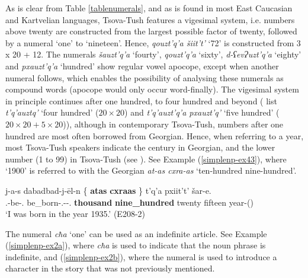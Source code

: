 As is clear from Table \ref{tablenumerals}, and as is found in most East Caucasian and Kartvelian languages, Tsova-Tush features a vigesimal system, i.e. numbers above twenty are constructed from the largest possible factor of twenty, followed by a numeral `one' to `nineteen'. Hence, \textit{qouzt'q'a šiit't'} `72' is constructed from 3 x 20 + 12. The numerals \textit{šauzt'q'a} `fourty', \textit{qouzt'q'a} `sixty', \textit{d-ʕevɁuzt'q'a} `eighty' and \textit{pxauzt'q'a} `hundred' show regular vowel apocope, except when another numeral follows, which enables the possibility of analysing these numerals as compound words (apocope would only occur word-finally). The vigesimal system in principle continues after one hundred, to four hundred and beyond (\citealt{kadkad84} list \textit{t'q'auztq'} `four hundred' ($20 \times 20$) and \textit{t'q'auzt'q'a pxauzt'q'} `five hundred' ($20 \times 20 + 5 \times 20$)), although in contemporary Tsova-Tush, numbers after one hundred are most often borrowed from Georgian. Hence, when referring to a year, most Tsova-Tush speakers indicate the century in Georgian, and the lower number (1 to 99) in Tsova-Tush (see \cite[173]{gippert08}). See Example (\ref{simplenp-ex43}), where `1900' is referred to with the Georgian \textit{at-as cxra-as} `ten-hundred nine-hundred'.

\begin{exe}
	\ex\label{simplenp-ex43}
	\gll j-a-s dabadbad-j-\={e}l-n {\{ \textbf{atas}} {\textbf{cxraas} \}} t'q'a pxiit't' šar-e. \\
	{\F}.{\Sg}-be-{\Fsg}.{\Nom} be\_born-{\F}.{\Sg}-{\Intr}-{\Ptcp}.{\Aor} \textbf{thousand} \textbf{nine\_hundred} twenty fifteen year-{\Obl}({\Ess}) \\
	\trans `I was born in the year 1935.'
	\hfill (E208-2)
\end{exe}

The numeral \textit{cħa} `one' can be used as an indefinite article. See Example (\ref{simplenp-ex2a}), where \textit{cħa} is used to indicate that the noun phrase is indefinite, and (\ref{simplenp-ex2b}), where the numeral is used to introduce a character in the story that was not previously mentioned.\largerpage

